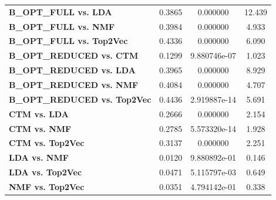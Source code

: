 \begin{table}[ht]
\begin{tabular}{lccc}
        \textbf{B\_OPT\_FULL vs. LDA}              & 0.3865        & 0.000000         & 12.439             \\
        \textbf{B\_OPT\_FULL vs. NMF}              & 0.3984        & 0.000000         & 4.933              \\
        \textbf{B\_OPT\_FULL vs. Top2Vec}          & 0.4336        & 0.000000         & 6.090              \\
        \textbf{B\_OPT\_REDUCED vs. CTM}           & 0.1299        & 9.880746e-07     & 1.023              \\
        \textbf{B\_OPT\_REDUCED vs. LDA}           & 0.3965        & 0.000000         & 8.929              \\
        \textbf{B\_OPT\_REDUCED vs. NMF}           & 0.4084        & 0.000000         & 4.707              \\
        \textbf{B\_OPT\_REDUCED vs. Top2Vec}       & 0.4436        & 2.919887e-14     & 5.691              \\
        \textbf{CTM vs. LDA}                       & 0.2666        & 0.000000         & 2.154              \\
        \textbf{CTM vs. NMF}                       & 0.2785        & 5.573320e-14     & 1.928              \\
        \textbf{CTM vs. Top2Vec}                   & 0.3137        & 0.000000         & 2.251              \\
        \textbf{LDA vs. NMF}                       & 0.0120        & 9.880892e-01     & 0.146              \\
        \textbf{LDA vs. Top2Vec}                   & 0.0471        & 5.115797e-03     & 0.649              \\
        \textbf{NMF vs. Top2Vec}                   & 0.0351        & 4.794142e-01     & 0.338              \\
        \bottomrule
    \end{tabular}
\end{table}

